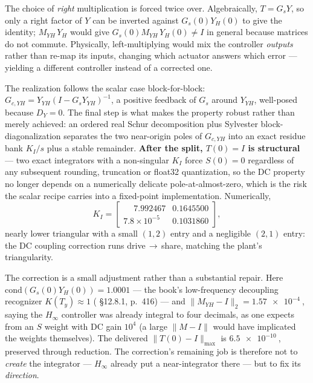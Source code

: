 \documentclass[energies,article,submit,pdftex,oneauthor]{Definitions/mdpi}
\begin{document}
The choice of \emph{right} multiplication is forced twice over. Algebraically, $T = G_s Y$, so
only a right factor of $Y$ can be inverted against $G_s(0)Y_H(0)$ to give the identity;
$M_{YH}\,Y_H$
would give $G_s(0)M_{YH}\,Y_H(0)\ne I$ in general because matrices do not commute. Physically,
left-multiplying would mix the controller \emph{outputs} rather than re-map its inputs, changing
which actuator answers which error --- yielding a different controller instead of a corrected one.

The realization follows the scalar case block-for-block:
$G_{c,YH} = Y_{YH}(I - G_s Y_{YH})^{-1}$, a positive feedback of $G_s$ around $Y_{YH}$,
well-posed because $D_Y = 0$. The final step is what makes the property robust rather than merely
achieved: an ordered real Schur decomposition plus Sylvester block-diagonalization separates the
two near-origin poles of $G_{c,YH}$ into an exact residue bank $K_I/s$ plus a stable remainder.
\textbf{After the split, $T(0)=I$ is structural} --- two exact integrators with a non-singular
$K_I$ force $S(0)=0$ regardless of any subsequent rounding, truncation or float32 quantization,
so the DC property no longer depends on a numerically delicate pole-at-almost-zero, which is the
risk the scalar recipe carries into a fixed-point implementation. Numerically,
\begin{equation}\label{eq:KI}
K_I = \begin{bmatrix} \phantom{-}7.992467 & 0.1645500 \\ 7.8\times10^{-5} & 0.1031860 \end{bmatrix},
\end{equation}
nearly lower triangular with a small $(1,2)$ entry and a negligible $(2,1)$ entry: the DC
coupling correction runs drive$\,\to\,$share, matching the plant's triangularity.

The correction is a small adjustment rather than a substantial repair. Here
$\mathrm{cond}(G_s(0)Y_H(0)) = 1.0001$ --- the book's low-frequency decoupling recognizer
$K(T_y)\approx1$ (\citep{assadian2020neoclassical} \S12.8.1, p.~416) --- and
$\|M_{YH} - I\|_2 = \SI{1.57e-4}{}$, saying the $H_\infty$
controller was already integral to four decimals, as one expects from an $S$ weight with DC gain
$10^4$ (a large $\|M-I\|$ would have implicated the weights themselves).
The delivered $\|T(0)-I\|_{\max}$ is $\SI{6.5e-10}{}$, preserved through reduction. The
correction's remaining job is therefore not to \emph{create} the integrator --- $H_\infty$ already
put a near-integrator there --- but to fix its \emph{direction}.
\end{document}
